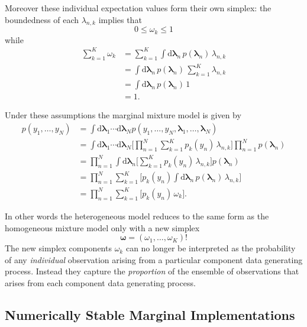 \documentclass[
  letterpaper,
  DIV=11,
  numbers=noendperiod]{scrartcl}
\begin{document}
Moreover these individual expectation values form their own simplex: the
boundedness of each \(\lambda_{n, k}\) implies that \[
0 \le \omega_{k} \le 1
\] while \begin{align*}
\sum_{k = 1}^{K} \omega_{k}
&=
\sum_{k = 1}^{K}
\int \mathrm{d} \boldsymbol{\lambda}_{n} \,
p(\boldsymbol{\lambda}_{n}) \, \lambda_{n, k}
\\
&=
\int \mathrm{d} \boldsymbol{\lambda}_{n} \,
p(\boldsymbol{\lambda}_{n}) \, \sum_{k = 1}^{K} \lambda_{n, k}
\\
&=
\int \mathrm{d} \boldsymbol{\lambda}_{n} \,
p(\boldsymbol{\lambda}_{n}) \, 1
\\
&=
1.
\end{align*}

Under these assumptions the marginal mixture model is given by
\begin{align*}
p(y_{1}, \ldots, y_{N})
&=
\int \mathrm{d} \boldsymbol{\lambda}_{1} \cdots
     \mathrm{d} \boldsymbol{\lambda}_{N}
p(y_{1}, \ldots, y_{N},
  \boldsymbol{\lambda}_{1}, \ldots, \boldsymbol{\lambda}_{N})
\\
&=
\int \mathrm{d} \boldsymbol{\lambda}_{1} \cdots
     \mathrm{d} \boldsymbol{\lambda}_{N}
\bigg[
\prod_{n = 1}^{N} \sum_{k = 1}^{K} p_{k}(y_{n}) \, \lambda_{n, k}
\bigg]
\prod_{n = 1}^{N} p(\boldsymbol{\lambda}_{n})
\\
&=
\prod_{n = 1}^{N}
\int \mathrm{d} \boldsymbol{\lambda}_{n}
\bigg[
\sum_{k = 1}^{K} p_{k}(y_{n}) \, \lambda_{n, k}
\bigg]
p(\boldsymbol{\lambda}_{n})
\\
&=
\prod_{n = 1}^{N}
\sum_{k = 1}^{K} \bigg[ p_{k}(y_{n})
\int \mathrm{d} \boldsymbol{\lambda}_{n} \,
p(\boldsymbol{\lambda}_{n}) \, \lambda_{n, k} \bigg]
\\
&=
\prod_{n = 1}^{N}
\sum_{k = 1}^{K} \bigg[ p_{k}(y_{n}) \, \omega_{k} \bigg].
\end{align*}

In other words the heterogeneous model reduces to the same form as the
homogeneous mixture model only with a new simplex \[
\boldsymbol{\omega} = (\omega_{1}, \ldots, \omega_{K})!
\] The new simplex components \(\omega_{k}\) can no longer be
interpreted as the probability of any \emph{individual} observation
arising from a particular component data generating process. Instead
they capture the \emph{proportion} of the ensemble of observations that
arises from each component data generating process.

\subsection{Numerically Stable Marginal
Implementations}\label{sec:stable_impl}
\end{document}
